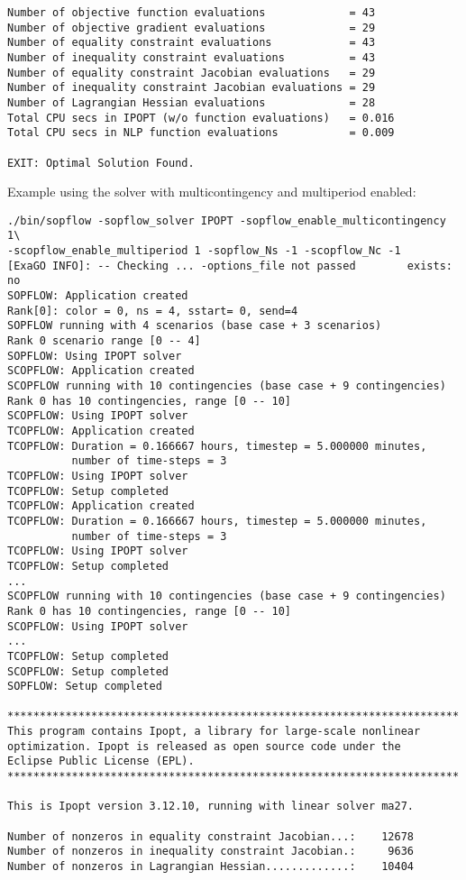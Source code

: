 \begin{lstlisting}
Number of objective function evaluations             = 43
Number of objective gradient evaluations             = 29
Number of equality constraint evaluations            = 43
Number of inequality constraint evaluations          = 43
Number of equality constraint Jacobian evaluations   = 29
Number of inequality constraint Jacobian evaluations = 29
Number of Lagrangian Hessian evaluations             = 28
Total CPU secs in IPOPT (w/o function evaluations)   = 0.016
Total CPU secs in NLP function evaluations           = 0.009

EXIT: Optimal Solution Found.
\end{lstlisting}

Example using the \ipopt solver with multicontingency and multiperiod enabled:

\begin{lstlisting}
./bin/sopflow -sopflow_solver IPOPT -sopflow_enable_multicontingency 1\
-scopflow_enable_multiperiod 1 -sopflow_Ns -1 -scopflow_Nc -1
[ExaGO INFO]: -- Checking ... -options_file not passed        exists: no
SOPFLOW: Application created
Rank[0]: color = 0, ns = 4, sstart= 0, send=4
SOPFLOW running with 4 scenarios (base case + 3 scenarios)
Rank 0 scenario range [0 -- 4]
SOPFLOW: Using IPOPT solver
SCOPFLOW: Application created
SCOPFLOW running with 10 contingencies (base case + 9 contingencies)
Rank 0 has 10 contingencies, range [0 -- 10]
SCOPFLOW: Using IPOPT solver
TCOPFLOW: Application created
TCOPFLOW: Duration = 0.166667 hours, timestep = 5.000000 minutes, 
          number of time-steps = 3
TCOPFLOW: Using IPOPT solver
TCOPFLOW: Setup completed
TCOPFLOW: Application created
TCOPFLOW: Duration = 0.166667 hours, timestep = 5.000000 minutes, 
          number of time-steps = 3
TCOPFLOW: Using IPOPT solver
TCOPFLOW: Setup completed
...
SCOPFLOW running with 10 contingencies (base case + 9 contingencies)
Rank 0 has 10 contingencies, range [0 -- 10]
SCOPFLOW: Using IPOPT solver
...
TCOPFLOW: Setup completed
SCOPFLOW: Setup completed
SOPFLOW: Setup completed

**********************************************************************
This program contains Ipopt, a library for large-scale nonlinear 
optimization. Ipopt is released as open source code under the 
Eclipse Public License (EPL).
**********************************************************************

This is Ipopt version 3.12.10, running with linear solver ma27.

Number of nonzeros in equality constraint Jacobian...:    12678
Number of nonzeros in inequality constraint Jacobian.:     9636
Number of nonzeros in Lagrangian Hessian.............:    10404


\end{lstlisting}

